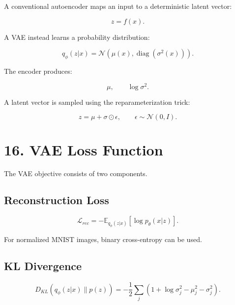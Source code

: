 \documentclass[10pt]{article}
\begin{document}
A conventional autoencoder maps an input to a deterministic latent vector:

\[
z=f(x).
\]

A VAE instead learns a probability distribution:

\[
q_{\phi}(z|x)
=
\mathcal{N}
\left(
\mu(x),
\operatorname{diag}(\sigma^2(x))
\right).
\]

The encoder produces:

\[
\mu,\qquad \log\sigma^2.
\]

A latent vector is sampled using the reparameterization trick:

\[
z=\mu+\sigma\odot\epsilon,
\qquad
\epsilon\sim\mathcal{N}(0,I).
\]

\begin{center}
\end{center}

\section*{16. VAE Loss Function}

The VAE objective consists of two components.

\subsection*{Reconstruction Loss}

\[
\mathcal{L}_{rec}
=
-\mathbb{E}_{q_{\phi}(z|x)}
[\log p_{\theta}(x|z)].
\]

For normalized MNIST images, binary cross-entropy can be used.

\subsection*{KL Divergence}

\[
D_{KL}
\left(
q_{\phi}(z|x)\parallel p(z)
\right)
=
-\frac{1}{2}
\sum_j
\left(
1+\log\sigma_j^2-\mu_j^2-\sigma_j^2
\right).
\]
\end{document}

